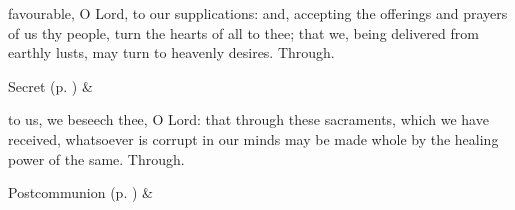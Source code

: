 
\secret
{} favourable, O Lord, to our supplications: and, accepting the offerings and prayers of us thy people, turn the hearts of all to thee; that we, being delivered from earthly lusts, may turn to heavenly desires. Through.

\begin{rubric}
     Secret  (p. \pageref{SPSaints}) \&  
\end{rubric}


\postcommunion
{} to us, we beseech thee, O Lord: that through these sacraments, which we have received, whatsoever is corrupt in our minds may be made whole by the healing power of the same. Through.

\begin{rubric}
     Postcommunion  (p. \pageref{SPSaints}) \&  
\end{rubric}